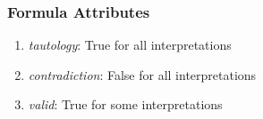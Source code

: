 \documentclass[dvipsnames]{beamer}
\begin{document}
%
%
%
%
%

\begin{frame}
  \frametitle{Formula Attributes}

  \begin{enumerate}
    \item \emph{tautology}: True for all interpretations
    \item \emph{contradiction}: False for all interpretations
    \item \emph{valid}: True for some interpretations
  \end{enumerate}
\end{frame}
\end{document}
